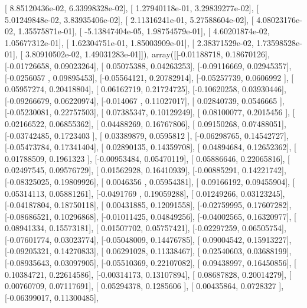 \documentclass{article}
\begin{document}
       [  8.85120436e-02,   6.33998328e-02],
       [  1.27940118e-01,   3.29839277e-02],
       [  5.01249848e-02,   3.83935406e-02],
       [  2.11316241e-01,   5.27588604e-02],
       [  4.08023176e-02,   1.35575871e-01],
       [ -5.13847404e-05,   1.98754579e-01],
       [  4.60201874e-02,   1.05677312e-01],
       [  1.62304751e-01,   1.85003909e-01],
       [  2.38371529e-02,   1.73598528e-01],
       [  3.80910502e-02,   1.49031283e-01]]), array([[-0.01188718,  0.18670126],
       [-0.01726658,  0.09023264],
       [ 0.05075388,  0.04263253],
       [-0.09116669,  0.02945357],
       [-0.0256057 ,  0.09895453],
       [-0.05564121,  0.20782914],
       [-0.05257739,  0.0606992 ],
       [ 0.05957274,  0.20418804],
       [ 0.06162719,  0.21724725],
       [-0.10620258,  0.03930446],
       [-0.09266679,  0.06220974],
       [-0.014067  ,  0.11027017],
       [ 0.02840739,  0.0546665 ],
       [-0.05230081,  0.22757503],
       [ 0.07385347,  0.10129249],
       [ 0.08100077,  0.2015456 ],
       [ 0.02166522,  0.06855362],
       [ 0.04488269,  0.16767806],
       [ 0.09150268,  0.07488051],
       [-0.03742485,  0.1723403 ],
       [ 0.03389879,  0.0595812 ],
       [-0.06298765,  0.14542727],
       [-0.05473784,  0.17341404],
       [ 0.02890135,  0.14359708],
       [ 0.04894684,  0.12652362],
       [ 0.01788509,  0.1961323 ],
       [-0.00953484,  0.05470119],
       [ 0.05886646,  0.22065816],
       [ 0.02497545,  0.09576729],
       [ 0.01562928,  0.16410939],
       [-0.00885291,  0.14221742],
       [-0.08325025,  0.19809926],
       [ 0.0046356 ,  0.05954381],
       [ 0.09166192,  0.09455904],
       [ 0.05314113,  0.05881261],
       [-0.0491769 ,  0.19059288],
       [ 0.01249266,  0.03123245],
       [-0.04187804,  0.18750118],
       [ 0.00431885,  0.12091558],
       [-0.02759995,  0.17607282],
       [-0.08686521,  0.10296868],
       [-0.01011425,  0.04849256],
       [-0.04002565,  0.16320977],
       [ 0.08941334,  0.15573181],
       [ 0.01507702,  0.05757421],
       [-0.02297259,  0.06505754],
       [-0.07601774,  0.03023774],
       [-0.05048009,  0.14476785],
       [ 0.09004542,  0.15913227],
       [-0.09205321,  0.14270833],
       [ 0.06291028,  0.11338467],
       [ 0.02540603,  0.03688199],
       [-0.08935643,  0.03097905],
       [-0.05510369,  0.22107082],
       [ 0.09438997,  0.16450856],
       [ 0.10384721,  0.22614586],
       [-0.00314173,  0.13107894],
       [ 0.08687828,  0.20014279],
       [ 0.00760709,  0.07117691],
       [ 0.05294378,  0.1285606 ],
       [ 0.00435864,  0.0728327 ],
       [-0.06399017,  0.11300485],
\end{document}
